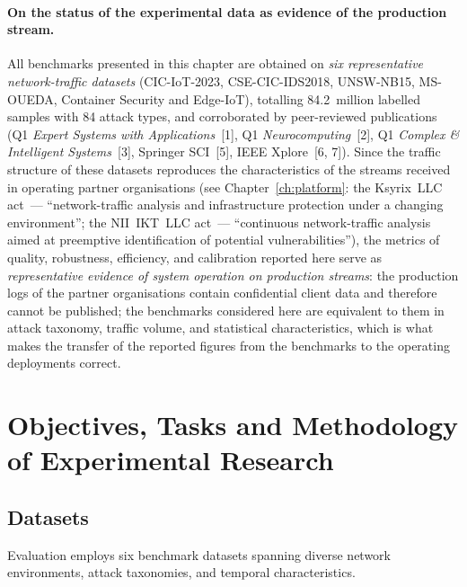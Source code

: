 \paragraph{On the status of the experimental data as evidence of
the production stream.}
All benchmarks presented in this chapter are obtained on \emph{six
representative network-traffic datasets} (CIC-IoT-2023,
CSE-CIC-IDS2018, UNSW-NB15, MS-OUEDA, Container Security and
Edge-IoT), totalling 84.2~million labelled samples with 84 attack
types, and corroborated by peer-reviewed publications (Q1
\emph{Expert Systems with Applications}~[1], Q1
\emph{Neurocomputing}~[2], Q1 \emph{Complex \& Intelligent
Systems}~[3], Springer SCI~[5], IEEE Xplore~[6, 7]). Since the
traffic structure of these datasets reproduces the characteristics
of the streams received in operating partner organisations (see
Chapter~\ref{ch:platform}: the Ksyrix~LLC act~--- ``network-traffic
analysis and infrastructure protection under a changing
environment''; the NII~IKT~LLC act~--- ``continuous network-traffic
analysis aimed at preemptive identification of potential
vulnerabilities''), the metrics of quality, robustness, efficiency,
and calibration reported here serve as \emph{representative
evidence of system operation on production streams}: the
production logs of the partner organisations contain confidential
client data and therefore cannot be published; the benchmarks
considered here are equivalent to them in attack taxonomy, traffic
volume, and statistical characteristics, which is what makes the transfer of the reported figures from the benchmarks to the operating deployments correct.

\section{Objectives, Tasks and Methodology of Experimental Research}
\label{sec:exp_methodology}

\subsection{Datasets}

Evaluation employs six benchmark datasets spanning diverse network environments, attack taxonomies, and temporal characteristics.

